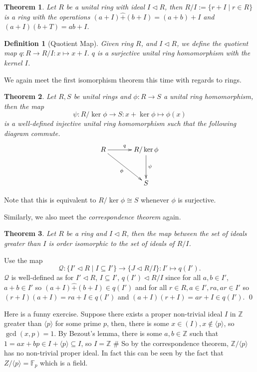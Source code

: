 \documentclass[
]{article}
\newtheorem{theorem}{Theorem}
\newtheorem{definition}{Definition}[theorem]
\begin{document}
\begin{theorem}
  Let \(R\) be a unital ring with ideal \(I \triangleleft R\), then 
  \(R / I := \{r + I \mid r \in R\}\) is a ring with the operations 
  \((a + I) \hat{+} (b + I) = (a + b) + I\) and \((a + I)(b + T) = ab + I\).
\end{theorem}
\begin{definition}[Quotient Map]
  Given ring \(R\), and \(I \triangleleft R\), we define the quotient map 
  \(q : R \to R / I : x \mapsto x + I\). \(q\) is a surjective unital ring 
  homomorphism with the kernel \(I\).
\end{definition}

We again meet the first isomorphism theorem this time with regards to
rings.

\begin{theorem}
  Let \(R, S\) be unital rings and \(\phi : R \to S\) a unital ring homomorphism,
  then the map
  \[
    \psi : R / \ker \phi \to S : x + \ker \phi \mapsto \phi(x)
  \]
  is a well-defined injective unital ring homomorphism such that the following 
  diagram commute.
  \[
    \xymatrix @ R=1.2cm @ C=1.2cm {
    R \ar[r]^{q} \ar[rd]_{\phi} & R / \ker \phi \ar[d]^{\psi} \\
    & S }
  \]
\end{theorem}

Note that this is equivalent to \(R / \ker \phi \cong S\) whenever
\(\phi\) is surjective.

Similarly, we also meet the \emph{correspondence theorem} again.

\begin{theorem}
  Let \(R\) be a ring and \(I \triangleleft R\), then the map between the set of 
  ideals greater than \(I\) is order isomorphic to the set of ideals of \(R / I\).
\end{theorem}
\proof

Use the map \[
    \mathcal{Q} : \{I' \triangleleft R \mid I \subseteq I'\} \to 
    \{J \triangleleft R / I\} : I' \mapsto q(I').
  \] \(\mathcal{Q}\) is well-defined as for \(I' \triangleleft R\),
\(I \subseteq I'\), \(q(I') \triangleleft R / I\) since for all
\(a, b \in I'\), \(a + b \in I'\) so
\((a + I) \hat{+} (b + I) \in q(I')\) and for all
\(r \in R, a \in I', ra, ar \in I'\) so
\((r + I)(a + I) = ra + I \in q(I')\) and
\((a + I)(r + I) = ar + I \in q(I')\). \qed

Here is a funny exercise. Suppose there exists a proper non-trivial
ideal \(I\) in \(\mathbb{Z}\) greater than \(\langle p \rangle\) for
some prime \(p\), then, there is some
\(x \in (I), x \notin \langle p \rangle\), so \(\gcd(x, p) = 1\). By
Bezout's lemma, there is some \(a, b \in \mathbb{Z}\) such that
\(1 = ax + bp \in I + \langle p \rangle \subseteq I\), so
\(I = \mathbb{Z}\) \# So by the correspondence theorem,
\(\mathbb{Z} / \langle p \rangle\) has no non-trivial proper ideal. In
fact this can be seen by the fact that
\(Z / \langle p \rangle = \mathbb{F}_p\) which is a field.
\end{document}
